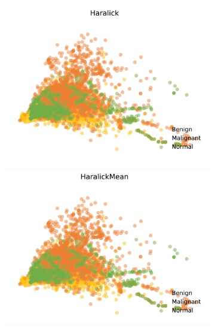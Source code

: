 \begin{figure}[H]
    \begin{subfigure}{.45\textwidth}
      \includegraphics[width=\textwidth]{contents/chapter_4/resources/visualisation_spatial_haralick.png}
    \end{subfigure}
    \begin{subfigure}{.45\textwidth}
      \includegraphics[width=\textwidth]{contents/chapter_4/resources/visualisation_spatial_haralickmean.png}
    \end{subfigure}
    

\end{figure}
